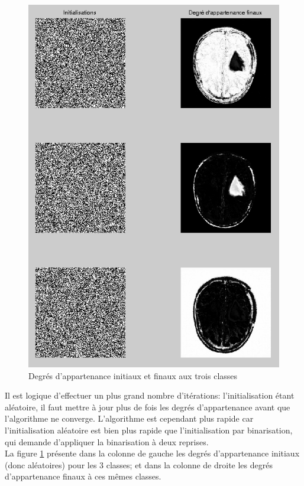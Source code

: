 		\begin{figure}[H]
			\centering
			\includegraphics[height=\textheight]{images/2-rand_init.png}
			\caption{Degrés d'appartenance initiaux et finaux aux trois classes}
			\label{fig:fcm_rand}
		\end{figure}

		Il est logique d'effectuer un plus grand nombre d'itérations: l'initialisation étant aléatoire, il faut mettre à jour plus de fois les degrés d'appartenance avant que l'algorithme ne converge. L'algorithme est cependant plus rapide car l'initialisation aléatoire est bien plus rapide que l'initialisation par binarisation, qui demande d'appliquer la binarisation à deux reprises.\\

		La figure \ref{fig:fcm_rand} présente dans la colonne de gauche les degrés d'appartenance initiaux (donc aléatoires) pour les 3 classes; et dans la colonne de droite les degrés d'appartenance finaux à ces mêmes classes.\\

